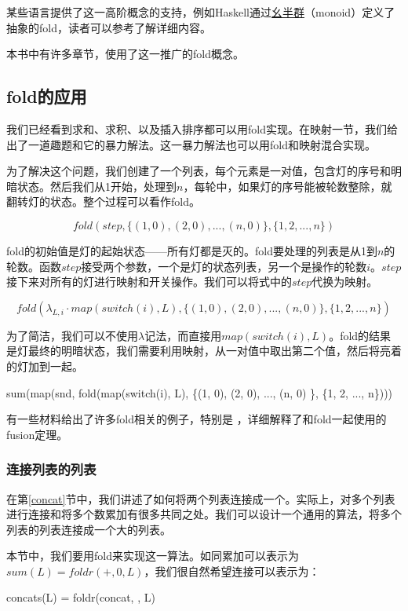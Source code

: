 \documentclass[b5paper]{ctexart}
\begin{document}
某些语言提供了这一高阶概念的支持，例如Haskell通过\underline{幺半群}（monoid）定义了抽象的fold，读者可以参考\cite{learn-haskell}了解详细内容。

本书中有许多章节，使用了这一推广的fold概念。

\subsection{fold的应用}

我们已经看到求和、求积、以及插入排序都可以用fold实现。在映射一节，我们给出了一道趣题和它的暴力解法。这一暴力解法也可以用fold和映射混合实现。

为了解决这个问题，我们创建了一个列表，每个元素是一对值，包含灯的序号和明暗状态。然后我们从1开始，处理到$n$，每轮中，如果灯的序号能被轮数整除，就翻转灯的状态。整个过程可以看作fold。

\[
fold(step, \{(1, 0), (2, 0), ..., (n, 0) \}, \{1, 2, ..., n\})
\]

fold的初始值是灯的起始状态——所有灯都是灭的。fold要处理的列表是从1到$n$的轮数。函数$step$接受两个参数，一个是灯的状态列表，另一个是操作的轮数$i$。$step$接下来对所有的灯进行映射和开关操作。我们可以将式中的$step$代换为映射。

\[
fold(\lambda_{L, i} \cdot map(switch(i), L), \{(1, 0), (2, 0), ..., (n, 0) \}, \{1, 2, ..., n\})
\]

为了简洁，我们可以不使用$\lambda$记法，而直接用$map(switch(i), L)$。fold的结果是灯最终的明暗状态，我们需要利用映射，从一对值中取出第二个值，然后将亮着的灯加到一起。

\be
sum(map(snd, fold(map(switch(i), L), \{(1, 0), (2, 0), ..., (n, 0) \}, \{1, 2, ..., n\})))
\ee

有一些材料给出了许多fold相关的例子，特别是 \cite{fp-pearls}，详细解释了和fold一起使用的fusion定理。

\subsubsection{连接列表的列表}

在第\ref{concat}节中，我们讲述了如何将两个列表连接成一个。实际上，对多个列表进行连接和将多个数累加有很多共同之处。我们可以设计一个通用的算法，将多个列表的列表连接成一个大的列表。

本节中，我们要用fold来实现这一算法。如同累加可以表示为$sum(L) = foldr(+, 0, L)$，我们很自然希望连接可以表示为：

\be
concats(L) = foldr(concat, \phi, L)
\ee
\end{document}
